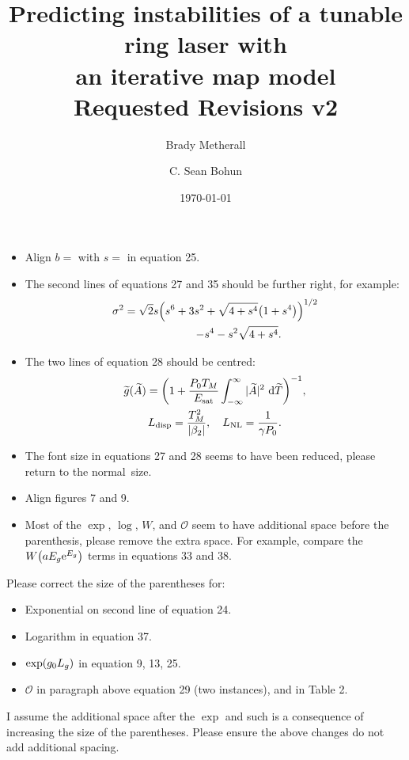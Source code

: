 \documentclass[11pt,a4paper]{article}
\title{Predicting instabilities of a tunable ring laser with \\
an iterative map model \\ \Large Requested Revisions v2}
\author{Brady Metherall \and C. Sean Bohun}
\date{\today}
\let\originalleft\left
\let\originalright\right
\renewcommand{\left}{\mathopen{}\mathclose\bgroup\originalleft}
\renewcommand{\right}{\aftergroup\egroup\originalright}
\newcommand{\Es}{E_{\textrm{sat}}} %
\newcommand{\df}{\, \textrm{d}}
\begin{document}
\maketitle
\begin{itemize}
	\item Align $b=$ with $s=$ in equation 25.
	\item The second lines of equations 27 and 35 should be further right, for example:
	\begin{equation}
		\begin{gathered}
		\sigma^2 = \sqrt{2} s \left( s^6 + 3s^2 + \sqrt{4 + s^4} \left( 1 + s^4 \right) \right)^{1/2} \\
		\hspace{15mm} - s^4 - s^2 \sqrt{4 + s^4}.
		\end{gathered}
	\end{equation}
	\item The two lines of equation 28 should be centred:
	\begin{equation}
		\begin{gathered}
			\widetilde{g}(\widetilde{A}) = \left( 1 + \frac{P_0 T_M}{\Es} \int_{-\infty}^\infty |\widetilde{A}|^2 \, \df \widetilde{T} \right)^{-1}, \\
			L_\textrm{disp} = \frac{T_M^2}{|\beta_2|}, \quad L_\textrm{NL} = \frac{1}{\gamma P_0}.
		\end{gathered}
	\end{equation}
	\item The font size in equations 27 and 28 seems to have been reduced, please return to the normal~size.
	\item Align figures 7 and 9.
	\item Most of the $\exp$, $\log$, $W$, and $\mathcal{O}$ seem to have additional space before the parenthesis, please remove the extra space. For example, compare the $W \left( a E_g \textrm{e}^{E_g} \right)$ terms in equations 33 and 38.
\end{itemize}

\noindent Please correct the size of the parentheses for:
\begin{itemize}
	\item Exponential on second line of equation 24.
	\item Logarithm in equation 37.
	\item $\exp \left( g_0 L_g \right)$ in equation 9, 13, 25.
	\item $\mathcal{O}$ in paragraph above equation 29 (two instances), and in Table 2.
\end{itemize}
I assume the additional space after the $\exp$ and such is a consequence of increasing the size of the parentheses. Please ensure the above changes do not add additional spacing.
\end{document}
